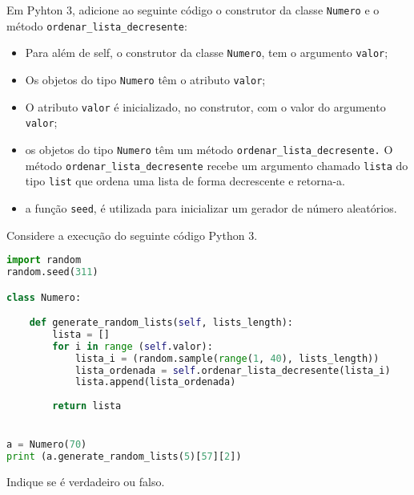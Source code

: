 \documentclass[12pt,varwidth=16cm,border=17pt]{standalone}
\begin{document}
Em Pyhton 3, adicione ao seguinte código o construtor da classe \verb+Numero+ e o método \verb+ordenar_lista_decresente+:

\begin{itemize}

  \item Para além de self, o construtor da classe \verb+Numero+, tem o argumento \verb+valor+;
  \item Os objetos do tipo \verb+Numero+ têm o atributo \verb+valor+;
  \item O atributo \verb+valor+ é inicializado, no construtor, com o valor
  do argumento \verb+valor+;
  \item os objetos do tipo \verb+Numero+ têm um método \verb+ordenar_lista_decresente.+ O
    método \verb+ordenar_lista_decresente+ recebe um argumento chamado \verb+lista+ do tipo
  \verb+list+ que ordena uma lista de forma decrescente e retorna-a.
    
  \item a função \verb+seed+, é utilizada para inicializar um gerador de número aleatórios.
    
\end{itemize}

Considere a execução do seguinte código Python 3.


\begin{lstlisting}[language=Python]
import random
random.seed(311)

class Numero:

    def generate_random_lists(self, lists_length):
        lista = []
        for i in range (self.valor):
            lista_i = (random.sample(range(1, 40), lists_length))
            lista_ordenada = self.ordenar_lista_decresente(lista_i)
            lista.append(lista_ordenada)
        
        return lista


a = Numero(70)
print (a.generate_random_lists(5)[57][2])
\end{lstlisting}

Indique se é verdadeiro ou falso.
\end{document}
